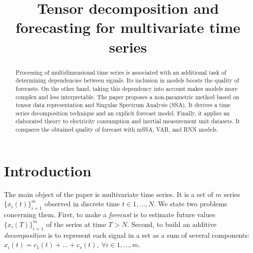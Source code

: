 \documentclass[referee, pdflatex, sn-mathphys-num]{sn-jnl}
\theoremstyle{definition}
\theoremstyle{plain}
\begin{document}
	
	\title{Tensor decomposition and forecasting for multivariate time series}
	
	\author*[1]{ }
	\author*[2]{ }
	
	
	
	\maketitle
	
	\begin{abstract}
		
		Processing of multidimensional time series is associated with an additional task of determining dependencies between signals. Its inclusion in models boosts the quality of forecasts. On the other hand, taking this dependency into account makes models more complex and less interpretable. The paper proposes a non-parametric method based on tensor data representation and Singular Spectrum Analysis (SSA). It derives a time series decomposition technique and an explicit forecast model. Finally, it applies an elaborated theory to electricity consumption and inertial measurement unit datasets. It compares the obtained quality of forecast with mSSA, VAR, and RNN models.
		
	\end{abstract}
	
	\section{Introduction}\label{Intro}
	
	The main object of the paper is multivariate time series. It is a set of $ m $ series $ \{x_i(t)\}_{i=1}^m $ observed in discrete time $ t \in 1 , \ldots , N $.	We state two problems concerning them. First, to make a \emph{forecast} is to estimate future values $ \{x_i(T)\}_{i=1}^m $ of the series at time $ T > N $. Second, to build an additive \emph{decomposition} is to represent each signal in a set as a sum of several components: $ x_i(t) = c_1(t) + \ldots + c_s(t), \ \forall i \in 1, \ldots , m $.
	
\end{document}
